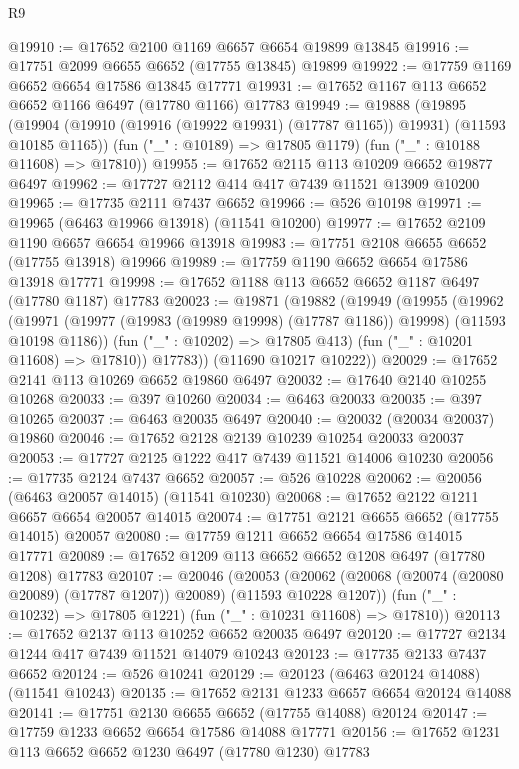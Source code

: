 \begin{lexlean}{R9}
\begin{coremodule}
@19910 := @17652 @2100 @1169 @6657 @6654 @19899 @13845
@19916 := @17751 @2099 @6655 @6652 (@17755 @13845) @19899
@19922 := @17759 @1169 @6652 @6654 @17586 @13845 @17771
@19931 := @17652 @1167 @113 @6652 @6652 @1166 @6497 (@17780 @1166) @17783
@19949 := @19888
    (@19895
      (@19904 (@19910 (@19916 (@19922 @19931) (@17787 @1165)) @19931) (@11593 @10185 @1165))
      (fun ("_" : @10189) => @17805 @1179)
      (fun ("_" : @10188 @11608) => @17810))
@19955 := @17652 @2115 @113 @10209 @6652 @19877 @6497
@19962 := @17727 @2112 @414 @417 @7439 @11521 @13909 @10200
@19965 := @17735 @2111 @7437 @6652
@19966 := @526 @10198
@19971 := @19965 (@6463 @19966 @13918) (@11541 @10200)
@19977 := @17652 @2109 @1190 @6657 @6654 @19966 @13918
@19983 := @17751 @2108 @6655 @6652 (@17755 @13918) @19966
@19989 := @17759 @1190 @6652 @6654 @17586 @13918 @17771
@19998 := @17652 @1188 @113 @6652 @6652 @1187 @6497 (@17780 @1187) @17783
@20023 := @19871
    (@19882
      (@19949
        (@19955
          (@19962
            (@19971 (@19977 (@19983 (@19989 @19998) (@17787 @1186)) @19998) (@11593 @10198 @1186))
            (fun ("_" : @10202) => @17805 @413)
            (fun ("_" : @10201 @11608) => @17810))
          @17783))
      (@11690 @10217 @10222))
@20029 := @17652 @2141 @113 @10269 @6652 @19860 @6497
@20032 := @17640 @2140 @10255 @10268
@20033 := @397 @10260
@20034 := @6463 @20033
@20035 := @397 @10265
@20037 := @6463 @20035 @6497
@20040 := @20032 (@20034 @20037) @19860
@20046 := @17652 @2128 @2139 @10239 @10254 @20033 @20037
@20053 := @17727 @2125 @1222 @417 @7439 @11521 @14006 @10230
@20056 := @17735 @2124 @7437 @6652
@20057 := @526 @10228
@20062 := @20056 (@6463 @20057 @14015) (@11541 @10230)
@20068 := @17652 @2122 @1211 @6657 @6654 @20057 @14015
@20074 := @17751 @2121 @6655 @6652 (@17755 @14015) @20057
@20080 := @17759 @1211 @6652 @6654 @17586 @14015 @17771
@20089 := @17652 @1209 @113 @6652 @6652 @1208 @6497 (@17780 @1208) @17783
@20107 := @20046
    (@20053
      (@20062 (@20068 (@20074 (@20080 @20089) (@17787 @1207)) @20089) (@11593 @10228 @1207))
      (fun ("_" : @10232) => @17805 @1221)
      (fun ("_" : @10231 @11608) => @17810))
@20113 := @17652 @2137 @113 @10252 @6652 @20035 @6497
@20120 := @17727 @2134 @1244 @417 @7439 @11521 @14079 @10243
@20123 := @17735 @2133 @7437 @6652
@20124 := @526 @10241
@20129 := @20123 (@6463 @20124 @14088) (@11541 @10243)
@20135 := @17652 @2131 @1233 @6657 @6654 @20124 @14088
@20141 := @17751 @2130 @6655 @6652 (@17755 @14088) @20124
@20147 := @17759 @1233 @6652 @6654 @17586 @14088 @17771
@20156 := @17652 @1231 @113 @6652 @6652 @1230 @6497 (@17780 @1230) @17783

\end{coremodule}
\end{lexlean}
